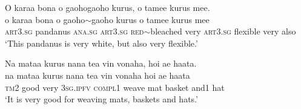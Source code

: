 \ea\label{ex:text9-20}
O karaa bona o gaohogaoho kurus, o tamee kurus mee.\\
\gll o	karaa	bona	o	gaoho{$\sim$}gaoho	kurus	o	tamee	kurus	mee\\
     \textsc{art}3.\textsc{sg}	pandanus	\textsc{ana}.\textsc{sg}	\textsc{art}3.\textsc{sg}	\textsc{red}{$\sim$}bleached	very	\textsc{art}3.\textsc{sg}	flexible	very	also\\
\glt `This pandanus is very white, but also very flexible.'
\z

\ea\label{ex:text9-21}
Na mataa kurus nana tea vin vonaha, hoi ae haata.\\
\gll na	mataa	kurus	nana	tea	vin	vonaha	hoi	ae	haata\\
     \textsc{tm}2	good	very	3\textsc{sg}.\textsc{ipfv}	\textsc{compl}1	weave	mat	basket	and1	hat\\
\glt `It is very good for weaving mats, baskets and hats.'
\z
